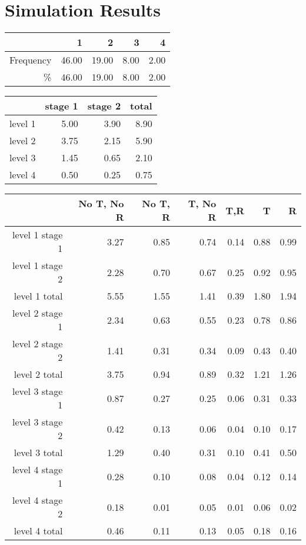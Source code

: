 \documentclass[]{article}
\begin{document}
\clearpage

\hypertarget{simulation-results}{%
\section{Simulation Results}\label{simulation-results}}

\begin{table}[ht]
\centering
\begin{tabular}{rrrrr}
  \hline
 & 1 & 2 & 3 & 4 \\ 
  \hline
Frequency & 46.00 & 19.00 & 8.00 & 2.00 \\ 
  \% & 46.00 & 19.00 & 8.00 & 2.00 \\ 
   \hline
\end{tabular}
\end{table}
\begin{table}[ht]
\centering
\begin{tabular}{rrrr}
  \hline
 & stage 1 & stage 2 & total \\ 
  \hline
level 1 & 5.00 & 3.90 & 8.90 \\ 
  level 2 & 3.75 & 2.15 & 5.90 \\ 
  level 3 & 1.45 & 0.65 & 2.10 \\ 
  level 4 & 0.50 & 0.25 & 0.75 \\ 
   \hline
\end{tabular}
\end{table}
\begin{table}[ht]
\centering
\begin{tabular}{rrrrrrr}
  \hline
 & No T, No R & No T, R & T, No R & T,R & T & R \\ 
  \hline
level 1 stage 1 & 3.27 & 0.85 & 0.74 & 0.14 & 0.88 & 0.99 \\ 
  level 1 stage 2 & 2.28 & 0.70 & 0.67 & 0.25 & 0.92 & 0.95 \\ 
  level 1 total & 5.55 & 1.55 & 1.41 & 0.39 & 1.80 & 1.94 \\ 
  level 2 stage 1 & 2.34 & 0.63 & 0.55 & 0.23 & 0.78 & 0.86 \\ 
  level 2 stage 2 & 1.41 & 0.31 & 0.34 & 0.09 & 0.43 & 0.40 \\ 
  level 2 total & 3.75 & 0.94 & 0.89 & 0.32 & 1.21 & 1.26 \\ 
  level 3 stage 1 & 0.87 & 0.27 & 0.25 & 0.06 & 0.31 & 0.33 \\ 
  level 3 stage 2 & 0.42 & 0.13 & 0.06 & 0.04 & 0.10 & 0.17 \\ 
  level 3 total & 1.29 & 0.40 & 0.31 & 0.10 & 0.41 & 0.50 \\ 
  level 4 stage 1 & 0.28 & 0.10 & 0.08 & 0.04 & 0.12 & 0.14 \\ 
  level 4 stage 2 & 0.18 & 0.01 & 0.05 & 0.01 & 0.06 & 0.02 \\ 
  level 4 total & 0.46 & 0.11 & 0.13 & 0.05 & 0.18 & 0.16 \\ 
   \hline
\end{tabular}
\end{table}
\end{document}
